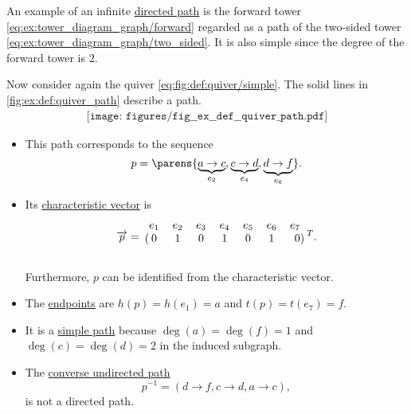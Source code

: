 \begin{example}\label{ex:def:quiver_path}
  An example of an infinite \hyperref[def:quiver_path]{directed path} is the forward tower \eqref{eq:ex:tower_diagram_graph/forward} regarded as a path of the two-sided tower \eqref{eq:ex:tower_diagram_graph/two_sided}. It is also simple since the degree of the forward tower is \( 2 \).

  Now consider again the quiver \eqref{eq:fig:def:quiver/simple}. The solid lines in \eqref{fig:ex:def:quiver_path} describe a path.
  \begin{equation}\label{fig:ex:def:quiver_path}
    \begin{aligned}
      \texttt{[image: figures/fig\_\_ex\_\_def\_\_quiver\_path.pdf]}
    \end{aligned}
  \end{equation}

  \begin{itemize}
    \item This path corresponds to the sequence
    \begin{equation*}
      p = \parens{ \underbrace{a \to c}_{e_2}, \underbrace{c \to d}_{e_4}, \underbrace{d \to f}_{e_6} }.
    \end{equation*}

    \item Its \hyperref[def:undirected_graph_path/characteristic_vector]{characteristic vector} is
    \begin{equation*}
      \vect{p}
      =
      \begin{blockarray}{ccccccr}
        e_1 & e_2 & e_3 & e_4 & e_5 & e_6 & e_7 \\
      \begin{block}{(ccccccr)}
        0   & 1   & 0   & 1   & 0   & 1   & 0   \\
      \end{block}
      \end{blockarray}
      {}^T.
    \end{equation*}

    Furthermore, \( p \) can be identified from the characteristic vector.

    \item The \hyperref[def:quiver_path/endpoints]{endpoints} are \( h(p) = h(e_1) = a \) and \( t(p) = t(e_7) = f \).

    \item It is a \hyperref[def:undirected_multigraph_path/simple]{simple path} because \( \deg(a) = \deg(f) = 1 \) and \( \deg(c) = \deg(d) = 2 \) in the induced subgraph.

    \item The \hyperref[def:undirected_multigraph_path/converse]{converse undirected path}
    \begin{equation*}
      p^{-1} = (d \to f, c \to d, a \to c),
    \end{equation*}
    is not a directed path.
  \end{itemize}
\end{example}

